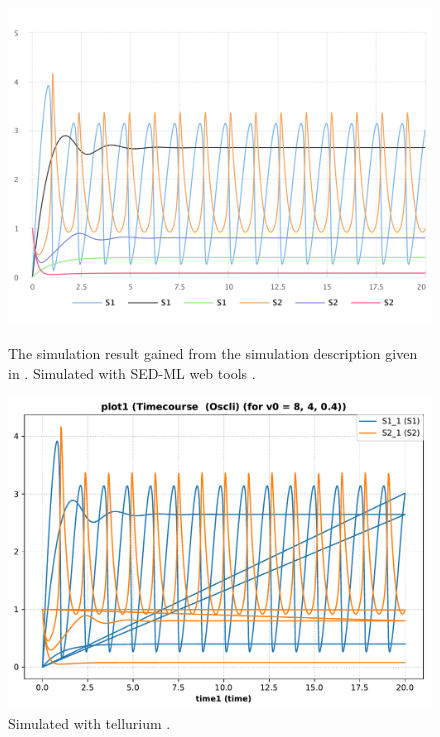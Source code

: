 \begin{figure}[ht]
    \centering
    \begin{minipage}{0.47\textwidth}
        \centering
        \includegraphics[width=1.0\textwidth]{examples/repeated-scan-oscli/results/sedml_webtools/plot1}
        \caption{The simulation result gained from the simulation description given in . Simulated with SED-ML web tools \citep{bergmann2017sed}.}
    \end{minipage}\hfill
    \begin{minipage}{0.47\textwidth}
        \centering
        \includegraphics[width=1.0\textwidth]{examples/repeated-scan-oscli/results/tellurium/plot1}
        \caption{Simulated with tellurium \citep{tellurium}.}
    \end{minipage}
    \label{fig:repeated-scan-oscli}
\end{figure}

